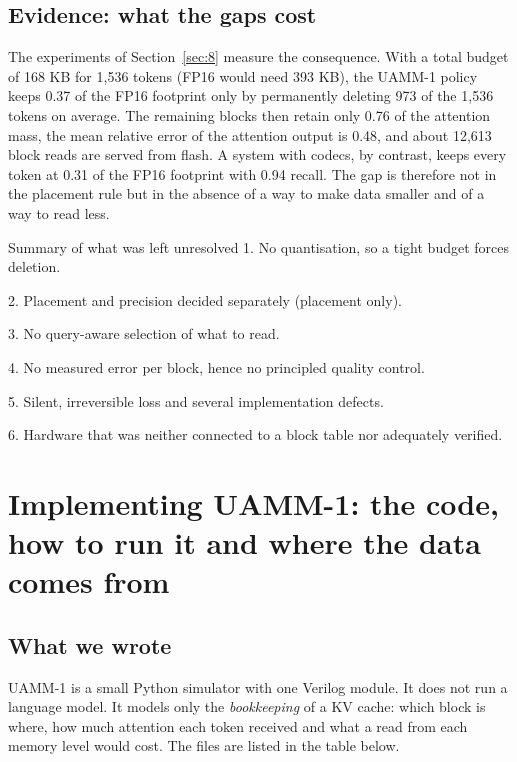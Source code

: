 \documentclass[12pt,a4paper]{report}
\begin{document}
\subsection{Evidence: what the gaps cost}\label{sec:4_3}
The experiments of Section~\ref{sec:8} measure the consequence. With a total budget of 168 KB for 1,536 tokens (FP16 would need 393 KB), the UAMM-1 policy keeps 0.37 of the FP16 footprint only by permanently deleting 973 of the 1,536 tokens on average. The remaining blocks then retain only 0.76 of the attention mass, the mean relative error of the attention output is 0.48, and about 12,613 block reads are served from flash. A system with codecs, by contrast, keeps every token at 0.31 of the FP16 footprint with 0.94 recall. The gap is therefore not in the placement rule but in the absence of a way to make data smaller and of a way to read less.

\begin{calloutbox}{Summary of what was left unresolved}
1. No quantisation, so a tight budget forces deletion.

2. Placement and precision decided separately (placement only).

3. No query-aware selection of what to read.

4. No measured error per block, hence no principled quality control.

5. Silent, irreversible loss and several implementation defects.

6. Hardware that was neither connected to a block table nor adequately verified.

\end{calloutbox}
\section{Implementing UAMM-1: the code, how to run it and where the data comes from}
\subsection{What we wrote}
UAMM-1 is a small Python simulator with one Verilog module. It does not run a language model. It models only the \textit{bookkeeping} of a KV cache: which block is where, how much attention each token received and what a read from each memory level would cost. The files are listed in the table below.
\end{document}
